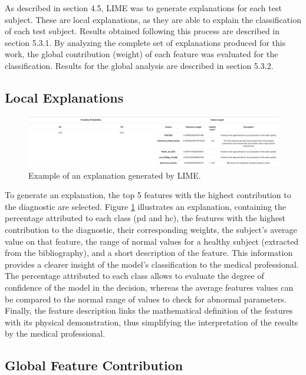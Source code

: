 As described in section 4.5, LIME was to generate explanations for each test subject. These are local explanations, as they are able to explain the classification of each test subject. Results obtained following this process are described in section 5.3.1. By analyzing the complete set of explanations produced for this work, the global contribution (weight) of each feature was evaluated for the classification. Results for the global analysis are described in section 5.3.2.

\subsection{Local Explanations}

\begin{figure}[t]
	\begin{center}
		\includegraphics[clip=true, width=\textwidth]{figs/example_explanation.png}
	\end{center}
	\caption{Example of an explanation generated by LIME.}
	\label{explanation}
\end{figure}

To generate an explanation, the top 5 features with the highest contribution to the diagnostic are selected. Figure \ref{explanation} illustrates an explanation, containing the percentage attributed to each class (\gls{pd} and \gls{hc}), the features with the highest contribution to the diagnostic, their corresponding weights, the subject's average value on that feature, the range of normal values for a healthy subject (extracted from the bibliography), and a short description of the feature. This information provides a clearer insight of the model's
classification to the medical professional. The percentage attributed to each class allows to evaluate the degree of confidence of the model in the decision, whereas the average features values can be compared to the normal range of values to check for abnormal parameters. Finally, the feature description links the mathematical definition of the features with its physical demonstration, thus simplifying the interpretation of the results by the medical
professional. 

\subsection{Global Feature Contribution}

